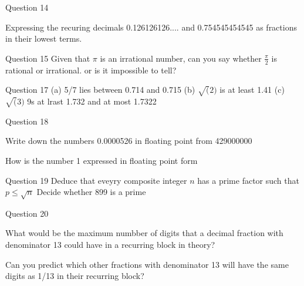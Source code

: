 \documentclass{article}
\begin{document}
Question 14

Expressing the recuring decimals 0.126126126.... and 0.754545454545 as fractions in their lowest terms.

Question 15
Given that $\pi$ is an irrational number, can you say whether $\frac{\pi}{2}$ is rational or irrational.
or is it impossible to tell?


Question 17
(a) 5/7 lies between 0.714 and 0.715
(b) $\sqrt(2)$ is at least 1.41
(c) $\sqrt(3)$  9s at lrast 1.732 and at most 1.7322

Question 18 

Write down the numbers 0.0000526 in floating point from
429000000

How is the number 1 expressed in floating point form

Question 19
Deduce that eveyry composite integer $n$ has a prime factor such that $p \leq \sqrt{n}$
Decide whether 899 is a prime

Question 20

What would be the maximum numbber of digits that a decimal fraction with denominator 13 
could have in a recurring block in theory?

Can you predict which other fractions with denominator 13 will have the same digits as 1/13 in their recurring block?
\end{document}
